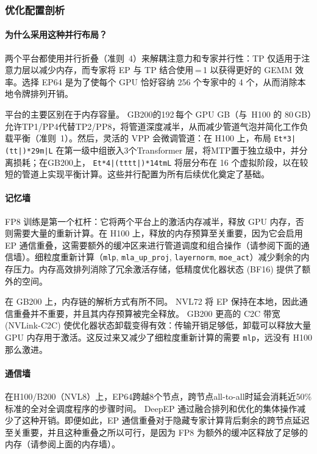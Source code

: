 \documentclass[10pt,logo,copyright]{nvidiatechreport_zh}
\begin{document}
\subsubsection{优化配置剖析}

\paragraph*{为什么采用这种并行布局？}
两个平台都使用并行折叠（准则~4）来解耦注意力和专家并行性：TP 仅适用于注意力层以减少内存，而专家将 EP 与 TP 结合使用\,=\,1 以获得更好的 GEMM 效率。选择 EP64 是为了使每个 GPU 恰好容纳 256 个专家中的 4 个，从而消除本地令牌排列开销。

平台的主要区别在于内存容量。 GB200的192\,每个 GPU GB（与\ H100 的 80\,GB）允许TP1/PP4代替TP2/PP8，将管道深度减半，从而减少管道气泡并简化工作负载平衡（准则~1）。然后，灵活的 VPP 会微调管道：在 H100 上，布局 \texttt{Et*3|(tt|)*29m|L} 在第一级中组嵌入3个Transformer 层，将MTP置于独立级中，并分离损耗；在GB200上， \texttt{Et*4|(tttt|)*14tmL} 将层分布在 16 个虚拟阶段，以在较短的管道上实现平衡计算。这些并行配置为所有后续优化奠定了基础。

\paragraph*{记忆墙}
FP8 训练是第一个杠杆：它将两个平台上的激活内存减半，释放 GPU 内存，否则需要大量的重新计算。在 H100 上，释放的内存预算至关重要，因为它会启用 EP 通信重叠，这需要额外的缓冲区来进行管道调度和组合操作（请参阅下面的通信墙）。细粒度重新计算（\texttt{mlp}, \texttt{mla\_up\_proj}, \texttt{layernorm}, \texttt{moe\_act}）减少剩余的内存压力。内存高效排列消除了冗余激活存储，低精度优化器状态 (BF16) 提供了额外的空间。

在 GB200 上，内存链的解析方式有所不同。 NVL72 将 EP 保持在本地，因此通信重叠并不重要，并且其内存预算被完全释放。 GB200 更高的 C2C 带宽 (NVLink-C2C) 使优化器状态卸载变得有效：传输开销足够低，卸载可以释放大量 GPU 内存用于激活。这反过来又减少了细粒度重新计算的需要 \texttt{mlp}，远没有 H100 那么激进。

\paragraph*{通信墙}
在H100/B200（NVL8）上，EP64跨越8个节点，跨节点all-to-all时延会消耗近50\% 标准的全对全调度程序的步骤时间。 DeepEP 通过融合排列和优化的集体操作减少了这种开销。即便如此，EP 通信重叠对于隐藏专家计算背后剩余的跨节点延迟至关重要，并且这种重叠之所以可行，是因为 FP8 为额外的缓冲区释放了足够的内存（请参阅上面的内存墙）。
\end{document}
